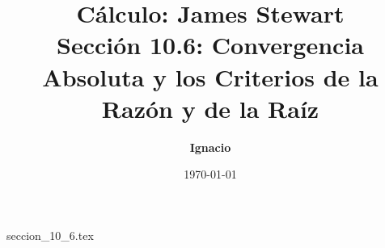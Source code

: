 \documentclass[11pt,spanish,oneside]{report}
\title{\textbf{Cálculo: James Stewart} \\ \Large Sección 10.6: Convergencia Absoluta y los Criterios de la Razón y de la Raíz}
\author{\textbf{Ignacio}}
\date{\today}
\begin{document}
\maketitle

{seccion_10_6.tex}
\end{document}
